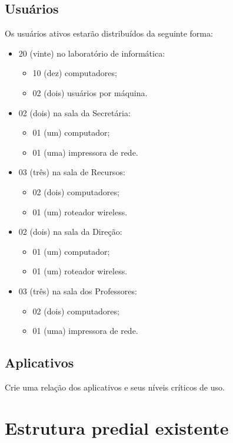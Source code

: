 \documentclass[	DIV=calc,%
							paper=a4,%
							fontsize=12pt,%
							onecolumn]{scrartcl}	 					%
\begin{document}
\subsection{Usuários}
Os usuários ativos estarão distribuídos da seguinte forma:
\begin{itemize}
	\item 20 (vinte) no laboratório de informática:
		\begin{itemize}
			\item 10 (dez) computadores;
			\item 02 (dois) usuários por máquina.
		\end{itemize}
	\item 02 (dois) na sala da Secretária:
	   \begin{itemize}
	   	\item 01 (um) computador; 
	   	\item 01 (uma) impressora de rede.
	   \end{itemize} 
	\item 03 (três) na sala de Recursos:
		\begin{itemize}
			\item 02 (dois) computadores;
			\item 01 (um) roteador wireless.
		\end{itemize}
	\item 02 (dois) na sala da Direção:
		\begin{itemize}
			\item 01 (um) computador;
			\item 01 (um) roteador wireless.
		\end{itemize}
	\item 03 (três) na sala dos Professores:
		\begin{itemize}
			\item 02 (dois) computadores;
			\item 01 (uma) impressora de rede.
		\end{itemize}
\end{itemize}
\subsection{Aplicativos}
Crie uma relação dos aplicativos e seus níveis críticos de uso.


\section{Estrutura predial existente}
\end{document}
